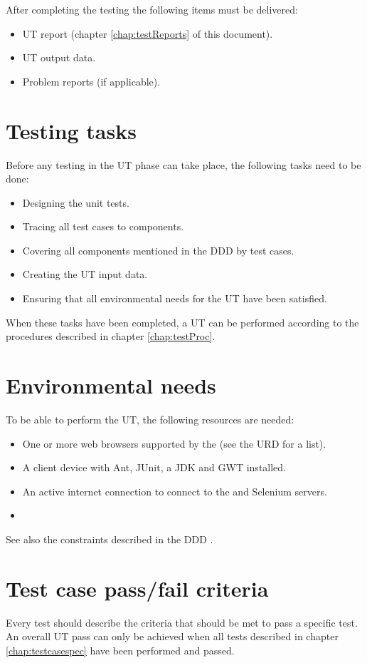 After completing the testing the following items must be delivered:

\begin{itemize}
  \item UT report (chapter \ref{chap:testReports} of this document).
  \item UT output data.
  \item Problem reports (if applicable).
\end{itemize}

\section{Testing tasks}
Before any testing in the UT phase can take place, the following tasks need to be done:

\begin{itemize}
  \item Designing the unit tests.
  \item Tracing all test cases to components.
  \item Covering all components mentioned in the DDD \cite{ddd} by test cases.
  \item Creating the UT input data.
  \item Ensuring that all environmental needs for the UT have been satisfied.
\end{itemize}

\noindent When these tasks have been completed, a UT can be performed according to the procedures described in chapter \ref{chap:testProc}.

\section{Environmental needs}
To be able to perform the UT, the following resources are needed:

\begin{itemize}
  \item One or more web browsers supported by the \applicationname{} (see the URD \cite{urd} for a list).
  \item A client device with Ant, JUnit, a JDK and GWT installed.
  \item An active internet connection to connect to the \projectnameplain{} and Selenium servers.
  \item {}
\end{itemize}

\noindent See also the constraints described in the DDD \cite{ddd}.

\section{Test case pass/fail criteria}
Every test should describe the criteria that should be met to pass a specific test. An overall UT pass can only be achieved when all tests described in chapter \ref{chap:testcasespec} have been performed and passed.
